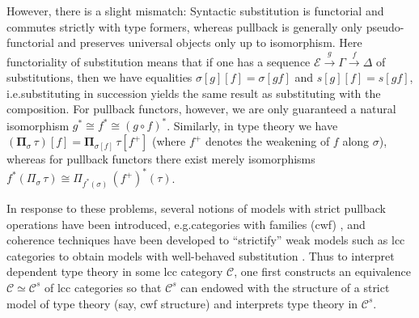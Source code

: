 \documentclass[a4paper]{article}
\theoremstyle{remark}
\theoremstyle{definition}
\begin{document}
However, there is a slight mismatch:
Syntactic substitution is functorial and commutes strictly with type formers, whereas pullback is generally only pseudo-functorial and preserves universal objects only up to isomorphism.
Here functoriality of substitution means that if one has a sequence $\mathcal{E} \xrightarrow{g} \Gamma \xrightarrow{f} \Delta$ of substitutions, then we have equalities $\sigma[g][f] = \sigma[gf]$ and $s[g][f] = s[gf]$, i.e.\@ substituting in succession yields the same result as substituting with the composition.
For pullback functors, however, we are only guaranteed a natural isomorphism $g^* \cong f^* \cong (g \circ f)^*$.
Similarly, in type theory we have $(\mathbf{\Pi}_\sigma \, \tau)[f] = \mathbf{\Pi}_{\sigma[f]} \, \tau[f^+]$ (where $f^+$ denotes the weakening of $f$ along $\sigma$), whereas for pullback functors there exist merely isomorphisms $f^*(\Pi_\sigma \, \tau) \cong \Pi_{f^*(\sigma)} \, (f^+)^*(\tau)$.

In response to these problems, several notions of models with strict pullback operations have been introduced, e.g.\@ categories with families (cwf) \cite{internal-type-theory}, and coherence techniques have been developed to ``strictify'' weak models such as lcc categories to obtain models with well-behaved substitution \cite{substitution-up-to-isomorphism,on-the-interpretation-of-type-theory-in-lcc-categories,the-local-universes-model}.
Thus to interpret dependent type theory in some lcc category $\mathcal{C}$, one first constructs an equivalence $\mathcal{C} \simeq \mathcal{C}^s$ of lcc categories so that $\mathcal{C}^s$ can endowed with the structure of a strict model of type theory (say, cwf structure) and interprets type theory in $\mathcal{C}^s$.
\end{document}

